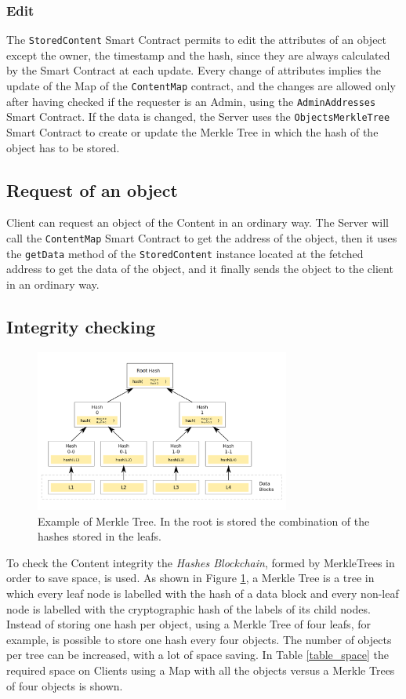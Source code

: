 \documentclass[hidelinks,conference,compsoc]{IEEEtran}
\begin{document}
\subsubsection{Edit} The \texttt{StoredContent} Smart Contract permits to edit the attributes of an object except the owner, the timestamp and the hash, since they are always calculated by the Smart Contract at each update. Every change of attributes implies the update of the Map of the \texttt{ContentMap} contract, and the changes are allowed only after having checked if the requester is an Admin, using the \texttt{AdminAddresses} Smart Contract. If the data is changed, the Server uses the \texttt{ObjectsMerkleTree} Smart Contract to create or update the Merkle Tree in which the hash of the object has to be stored.

\subsection{Request of an object}
Client can request an object of the Content in an ordinary way. The Server will call the \texttt{ContentMap} Smart Contract to get the address of the object, then it uses the \texttt{getData} method of the \texttt{StoredContent} instance located at the fetched address to get the data of the object, and it finally sends the object to the client in an ordinary way. 

\subsection{Integrity checking}
\label{sec:Clienthashes}
\begin{figure}[!h]
	\centering
	\includegraphics[width=3.3in]{images/Merkletree.png}
	
	\caption{Example of Merkle Tree. In the root is stored the combination of the hashes stored in the leafs.}
	\label{fig:tree}
\end{figure} 
To check the Content integrity the \textit{Hashes Blockchain}, formed by MerkleTrees in order to save space, is used. As shown in Figure \ref{fig:tree}, a Merkle Tree is a tree in which every leaf node is labelled with the hash of a data block and every non-leaf node is labelled with the cryptographic hash of the labels of its child nodes. Instead of storing one hash per object, using a Merkle Tree of four leafs, for example, is possible to store one hash every four objects. The number of objects per tree can be increased, with a lot of space saving. In Table \ref{table_space} the required space on Clients using a Map with all the objects versus a Merkle Trees of four objects is shown. 
\end{document}
